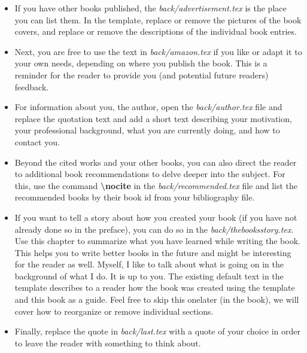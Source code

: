 \begin{itemize}

\item If you have other books published, the \textit{back/advertisement.tex} is the place you can list them. In the template, replace or remove the pictures of the book covers, and replace or remove the descriptions of the individual book entries.

\item Next, you are free to use the text in \textit{back/amazon.tex} if you like or adapt it to your own needs, depending on where you publish the book. This is a reminder for the reader to provide you (and potential future readers) feedback.

\item For information about you, the author, open the \textit{back/author.tex} file and replace the quotation text and add a short text describing your motivation, your professional background, what you are currently doing, and how to contact you.

\item Beyond the cited works and your other books, you can also direct the reader to additional book recommendations to delve deeper into the subject. For this, use the command \textbf{\textbackslash nocite} in the \textit{back/recommended.tex} file and list the recommended books by their book id from your bibliography file.

\item If you want to tell a story about how you created your book (if you have not already done so in the preface), you can do so in the \textit{back/thebooksstory.tex}. Use this chapter to summarize what you have learned while writing the book. This helps you to write better books in the future and might be interesting for the reader as well. Myself, I like to talk about what is going on in the background of what I do. It is up to you. The existing default text in the template describes to a reader how the book was created using the template and this book as a guide. Feel free to skip this one\emdash{}later (in the book), we will cover how to reorganize or remove individual sections.

\item Finally, replace the quote in \textit{back/last.tex} with a quote of your choice in order to leave the reader with something to think about.

\end{itemize}

